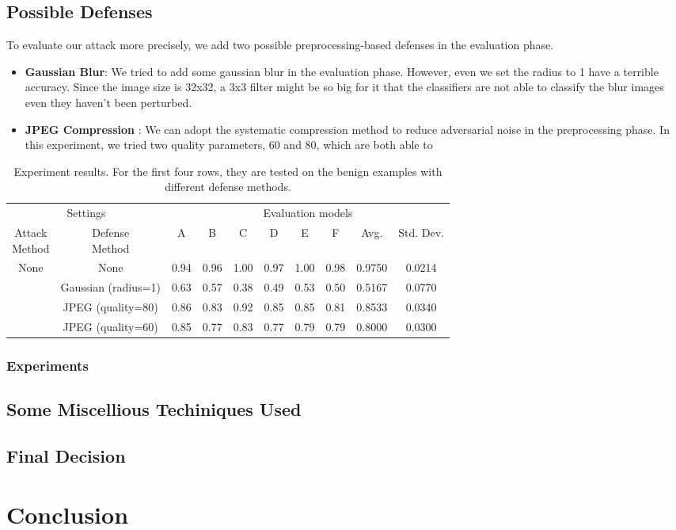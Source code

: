\documentclass{article}
\begin{document}
\subsection{Possible Defenses}
To evaluate our attack more precisely, we add two possible preprocessing-based defenses in the evaluation phase.
\begin{itemize}
  \item \textbf{Gaussian Blur}: We tried to add some gaussian blur in the evaluation phase. However, even we set the radius to 1 have a terrible accuracy. Since the image size is 32x32, a 3x3 filter might be so big for it that the classifiers are not able to classify the blur images even they haven't been perturbed.
  \item \textbf{JPEG Compression} \cite{das2017keeping}: We can adopt the systematic compression method to reduce adversarial noise in the preprocessing phase. In this experiment, we tried two quality parameters, 60 and 80, which are both able to
\end{itemize}

\begin{table}
  \label{defense-experiments}
  \centering
  \caption{Experiment results. For the first four rows, they are tested on the benign examples with different defense methods.}
  \begin{tabular}{cccccccccc}
    \toprule
    \multicolumn{2}{c}{Settings} & \multicolumn{8}{c}{Evaluation models} \\
    \cmidrule(r){1-2} \cmidrule(r){3-10}
    \makecell{Attack \\ Method} & \makecell{Defense \\ Method} & A & B & C & D & E & F & Avg. & Std. Dev. \\
    \midrule

    \multirow{4}{*}{None} & None                & 0.94 & 0.96 & 1.00 & 0.97 & 1.00 & 0.98 & 0.9750 & 0.0214 \\
                          & Gaussian (radius=1) & 0.63 & 0.57 & 0.38 & 0.49 & 0.53 & 0.50 & 0.5167 & 0.0770 \\
                          & JPEG (quality=80)   & 0.86 & 0.83 & 0.92 & 0.85 & 0.85 & 0.81 & 0.8533 & 0.0340 \\
                          & JPEG (quality=60)   & 0.85 & 0.77 & 0.83 & 0.77 & 0.79 & 0.79 & 0.8000 & 0.0300 \\
    \bottomrule
  \end{tabular}
\end{table}

\subsubsection*{Experiments}

\subsection{Some Miscellious Techiniques Used}

\subsection{Final Decision}

\section{Conclusion}



\end{document}
